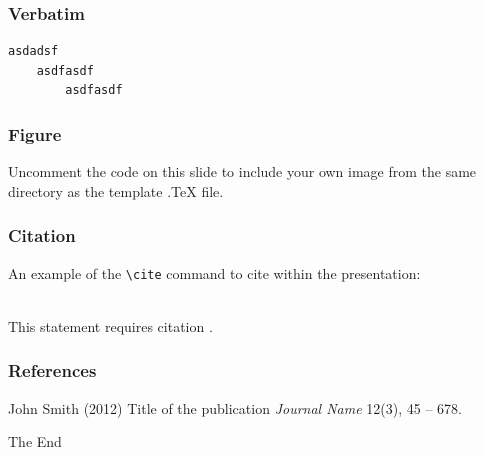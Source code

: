 \documentclass{beamer}
\begin{document}

\begin{frame}[fragile]
\frametitle{Verbatim}
\begin{theorem}[Aasdf]
\begin{verbatim}
asdadsf
	asdfasdf
    	asdfasdf
\end{verbatim}
\end{theorem}
\end{frame}



\begin{frame}
\frametitle{Figure}
Uncomment the code on this slide to include your own image from the same directory as the template .TeX file.
\end{frame}


\begin{frame}[fragile] %
\frametitle{Citation}
An example of the \verb|\cite| command to cite within the presentation:\\~

This statement requires citation \cite{p1}.
\end{frame}


\begin{frame}
\frametitle{References}
\footnotesize{
\begin{thebibliography}{99} %
 John Smith (2012)
\newblock Title of the publication
\newblock \emph{Journal Name} 12(3), 45 -- 678.
\end{thebibliography}
}
\end{frame}


\begin{frame}
\Huge{\centerline{The End}}
\end{frame}

\end{document}

